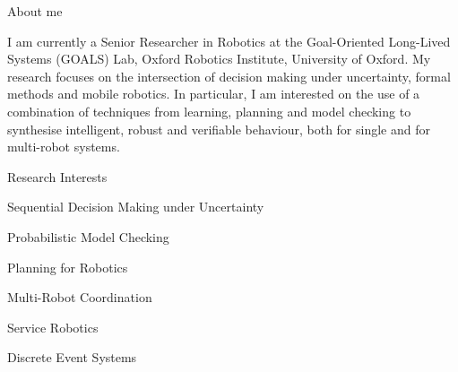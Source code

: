 
\begin{rSection}{About me}

I am currently a Senior Researcher in Robotics at the  Goal-Oriented Long-Lived Systems (GOALS) Lab, Oxford Robotics Institute, University of Oxford.
%
My research focuses on the intersection of decision making under uncertainty, formal methods and mobile robotics.
%
In particular, I am interested on the use of a combination of techniques from learning, planning and model checking to synthesise intelligent, robust and verifiable behaviour, both  for single and for multi-robot systems.


\begin{rSubsection}{Research Interests	}{}{}{}
\item Sequential Decision Making under Uncertainty
\item Probabilistic Model Checking
\item Planning for Robotics
\item Multi-Robot Coordination
\item Service Robotics
\item Discrete Event Systems
\end{rSubsection}





\end{rSection}
